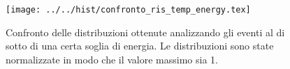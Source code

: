 \begin{figure}[h] \centering\texttt{[image: ../../hist/confronto\_ris\_temp\_energy.tex]}\caption{Confronto delle distribuzioni ottenute analizzando gli eventi al di sotto di una certa soglia di energia. Le distribuzioni sono state normalizzate in modo che il valore massimo sia 1.}\label{hist:confronto_ris_temp_energy} \end{figure}
